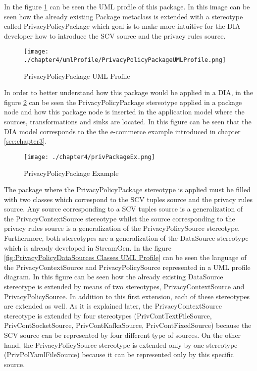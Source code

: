 In the figure \ref{fig:PrivacyPolicyPackage UML Profile} can be seen the UML profile of this package. In this image can be seen how the already existing Package metaclass is extended with a stereotype called PrivacyPolicyPackage which goal is to make more intuitive for the DIA developer how to introduce the SCV source and the privacy rules source.

\begin{figure}
\centering
{\texttt{[image: ./chapter4/umlProfile/PrivacyPolicyPackageUMLProfile.png]}}
\caption{PrivacyPolicyPackage UML Profile}
\label{fig:PrivacyPolicyPackage UML Profile}
\end{figure}

In order to better understand how this package would be applied in a DIA, in the figure \ref{fig:PrivacyPolicyPackage Example} can be seen the PrivacyPolicyPackage stereotype applied in a package node and how this package node is inserted in the application model where the sources, transformations and sinks are located. In this figure can be seen that the DIA model corresponds to the the e-commerce example introduced in chapter \ref{sec:chapter3}.

\begin{figure}
\centering
{\texttt{[image: ./chapter4/privPackageEx.png]}}
\caption{PrivacyPolicyPackage Example}
\label{fig:PrivacyPolicyPackage Example}
\end{figure}


The package where the PrivacyPolicyPackage stereotype is applied must be filled with two classes which correspond to the SCV tuples source and the privacy rules source. Any source corresponding to a SCV tuples source is a generalization of the PrivacyContextSource stereotype whilst the source corresponding to the privacy rules source is a generalization of the PrivacyPolicySource stereotype. Furthermore, both stereotypes are a generalization of the DataSource stereotype which is already developed in StreamGen. In the figure \ref{fig:PrivacyPolicyDataSources Classes UML Profile} can be seen the language of the PrivacyContextSource and PrivacyPolicySource represented in a UML profile diagram. In this figure can be seen how the already existing DataSource stereotype is extended by means of two stereotypes, PrivacyContextSource and PrivacyPolicySource. In addition to this first extension, each of these stereotypes are extended as well. As it is explained later, the PrivacyContextSource stereotype is extended by four stereotypes (PrivContTextFileSource, PrivContSocketSource, PrivContKafkaSource, PrivContFixedSource) because the SCV source can be represented by four different type of sources. On the other hand, the PrivacyPolicySource stereotype is extended only by one stereotype (PrivPolYamlFileSource) because it can be represented only by this specific source.

